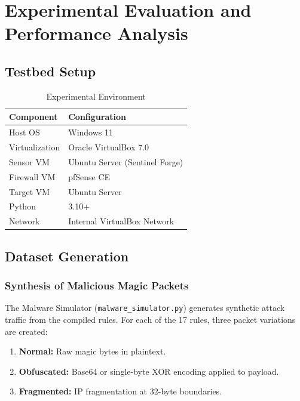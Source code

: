 \chapter{Experimental Evaluation and Performance Analysis}

\section{Testbed Setup}

\begin{table}[h]
\centering
\caption{Experimental Environment}
\label{tab:testbed}
\begin{tabular}{|l|l|}
\hline
\textbf{Component} & \textbf{Configuration} \\
\hline
Host OS & Windows 11 \\
\hline
Virtualization & Oracle VirtualBox 7.0 \\
\hline
Sensor VM & Ubuntu Server (Sentinel Forge) \\
\hline
Firewall VM & pfSense CE \\
\hline
Target VM & Ubuntu Server \\
\hline
Python & 3.10+ \\
\hline
Network & Internal VirtualBox Network \\
\hline
\end{tabular}
\end{table}

\section{Dataset Generation}

\subsection{Synthesis of Malicious Magic Packets}

The Malware Simulator (\texttt{malware\_simulator.py}) generates synthetic attack traffic from the compiled rules. For each of the 17 rules, three packet variations are created:

\begin{enumerate}
    \item \textbf{Normal:} Raw magic bytes in plaintext.
    \item \textbf{Obfuscated:} Base64 or single-byte XOR encoding applied to payload.
    \item \textbf{Fragmented:} IP fragmentation at 32-byte boundaries.
\end{enumerate}

